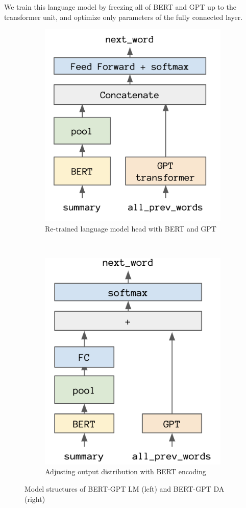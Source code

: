 \documentclass{article}
\begin{document}
We train this language model by freezing all of BERT and GPT up to the transformer unit, and optimize only parameters of the fully connected layer.

\begin{figure}[h]
    \centering
    \begin{subfigure}[t]{0.5\textwidth}
        \centering
        \includegraphics[scale=0.25]{bert_lm.png}
        \caption{Re-trained language model head with BERT and GPT}
    \end{subfigure}%
    ~ 
    \begin{subfigure}[t]{0.5\textwidth}
        \centering
        \includegraphics[scale=0.25]{bert_gpt_adj.png}
        \caption{Adjusting output distribution with BERT encoding}
    \end{subfigure}
    \caption{Model structures of BERT-GPT LM (left) and BERT-GPT DA (right)}
\end{figure}
\end{document}
